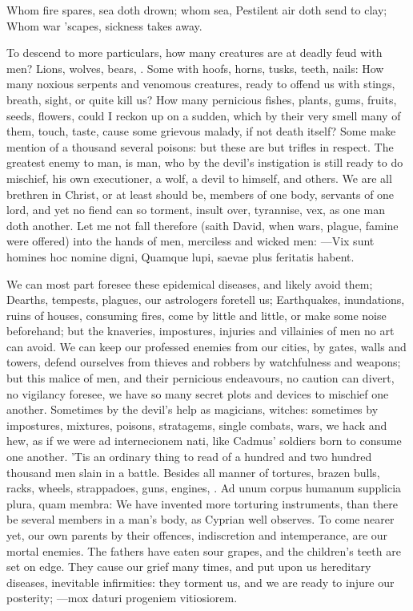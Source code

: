 {Whom fire spares, sea doth drown; whom sea,
Pestilent air doth send to clay;
Whom war 'scapes, sickness takes away.

To descend to more particulars, how many creatures are at deadly feud
with men? Lions, wolves, bears, \etc{}. Some with hoofs, horns, tusks,
teeth, nails: How many noxious serpents and venomous creatures, ready
to offend us with stings, breath, sight, or quite kill us? How many
pernicious fishes, plants, gums, fruits, seeds, flowers, \etc{} could I
reckon up on a sudden, which by their very smell many of them, touch,
taste, cause some grievous malady, if not death itself? Some make
mention of a thousand several poisons: but these are but trifles in
respect. The greatest enemy to man, is man, who by the devil's
instigation is still ready to do mischief, his own executioner, a wolf,
a devil to himself, and others. We are all brethren in Christ, or
at least should be, members of one body, servants of one lord, and yet
no fiend can so torment, insult over, tyrannise, vex, as one man doth
another. Let me not fall therefore (saith David, when wars, plague,
famine were offered) into the hands of men, merciless and wicked men:
---Vix sunt homines hoc nomine digni,
Quamque lupi, saevae plus feritatis habent.

We can most part foresee these epidemical diseases, and likely avoid
them; Dearths, tempests, plagues, our astrologers foretell us;
Earthquakes, inundations, ruins of houses, consuming fires, come by
little and little, or make some noise beforehand; but the knaveries,
impostures, injuries and villainies of men no art can avoid. We can
keep our professed enemies from our cities, by gates, walls and towers,
defend ourselves from thieves and robbers by watchfulness and weapons;
but this malice of men, and their pernicious endeavours, no caution can
divert, no vigilancy foresee, we have so many secret plots and devices
to mischief one another.
Sometimes by the devil's help as magicians, witches: sometimes by
impostures, mixtures, poisons, stratagems, single combats, wars, we
hack and hew, as if we were ad internecionem nati, like Cadmus'
soldiers born to consume one another. 'Tis an ordinary thing to read of
a hundred and two hundred thousand men slain in a battle. Besides all
manner of tortures, brazen bulls, racks, wheels, strappadoes, guns,
engines, \etc{}. Ad unum corpus humanum supplicia plura, quam membra:
We have invented more torturing instruments, than there be several
members in a man's body, as Cyprian well observes. To come nearer yet,
our own parents by their offences, indiscretion and intemperance, are
our mortal enemies. The fathers have eaten sour grapes, and the
children's teeth are set on edge. They cause our grief many times, and
put upon us hereditary diseases, inevitable infirmities: they torment
us, and we are ready to injure our posterity;
---mox daturi progeniem vitiosiorem.

}
